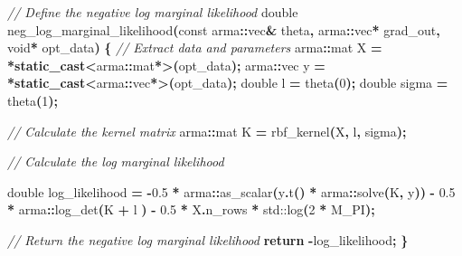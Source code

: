 \documentclass[
]{article}
\newenvironment{Shaded}{\begin{snugshade}}{\end{snugshade}}
\newcommand{\AttributeTok}[1]{\textcolor[rgb]{0.13,0.29,0.53}{#1}}
\newcommand{\BuiltInTok}[1]{#1}
\newcommand{\CommentTok}[1]{\textcolor[rgb]{0.56,0.35,0.01}{\textit{#1}}}
\newcommand{\ControlFlowTok}[1]{\textcolor[rgb]{0.13,0.29,0.53}{\textbf{#1}}}
\newcommand{\DataTypeTok}[1]{\textcolor[rgb]{0.13,0.29,0.53}{#1}}
\newcommand{\DecValTok}[1]{\textcolor[rgb]{0.00,0.00,0.81}{#1}}
\newcommand{\FloatTok}[1]{\textcolor[rgb]{0.00,0.00,0.81}{#1}}
\newcommand{\KeywordTok}[1]{\textcolor[rgb]{0.13,0.29,0.53}{\textbf{#1}}}
\newcommand{\NormalTok}[1]{#1}
\newcommand{\OperatorTok}[1]{\textcolor[rgb]{0.81,0.36,0.00}{\textbf{#1}}}
\begin{document}
\begin{Shaded}
\begin{Highlighting}[]
\CommentTok{// Define the negative log marginal likelihood}
\DataTypeTok{double}\NormalTok{ neg\_log\_marginal\_likelihood}\OperatorTok{(}\AttributeTok{const}\NormalTok{ arma}\OperatorTok{::}\NormalTok{vec}\OperatorTok{\&}\NormalTok{ theta}\OperatorTok{,}\NormalTok{ arma}\OperatorTok{::}\NormalTok{vec}\OperatorTok{*}\NormalTok{ grad\_out}\OperatorTok{,} \DataTypeTok{void}\OperatorTok{*}\NormalTok{ opt\_data}\OperatorTok{)} \OperatorTok{\{}
    \CommentTok{// Extract data and parameters}
\NormalTok{    arma}\OperatorTok{::}\NormalTok{mat X }\OperatorTok{=} \OperatorTok{*}\KeywordTok{static\_cast}\OperatorTok{\textless{}}\NormalTok{arma}\OperatorTok{::}\NormalTok{mat}\OperatorTok{*\textgreater{}(}\NormalTok{opt\_data}\OperatorTok{);}
\NormalTok{    arma}\OperatorTok{::}\NormalTok{vec y }\OperatorTok{=} \OperatorTok{*}\KeywordTok{static\_cast}\OperatorTok{\textless{}}\NormalTok{arma}\OperatorTok{::}\NormalTok{vec}\OperatorTok{*\textgreater{}(}\NormalTok{opt\_data}\OperatorTok{);}
    \DataTypeTok{double}\NormalTok{ l }\OperatorTok{=}\NormalTok{ theta}\OperatorTok{(}\DecValTok{0}\OperatorTok{);}
    \DataTypeTok{double}\NormalTok{ sigma }\OperatorTok{=}\NormalTok{ theta}\OperatorTok{(}\DecValTok{1}\OperatorTok{);}

    \CommentTok{// Calculate the kernel matrix}
\NormalTok{    arma}\OperatorTok{::}\NormalTok{mat K }\OperatorTok{=}\NormalTok{ rbf\_kernel}\OperatorTok{(}\NormalTok{X}\OperatorTok{,}\NormalTok{ l}\OperatorTok{,}\NormalTok{ sigma}\OperatorTok{);}

    \CommentTok{// Calculate the log marginal likelihood}
    
    \DataTypeTok{double}\NormalTok{ log\_likelihood }\OperatorTok{=} \OperatorTok{{-}}\FloatTok{0.5} \OperatorTok{*}\NormalTok{ arma}\OperatorTok{::}\NormalTok{as\_scalar}\OperatorTok{(}\NormalTok{y}\OperatorTok{.}\NormalTok{t}\OperatorTok{()} \OperatorTok{*}\NormalTok{ arma}\OperatorTok{::}\NormalTok{solve}\OperatorTok{(}\NormalTok{K}\OperatorTok{,}\NormalTok{ y}\OperatorTok{))} \OperatorTok{{-}} \FloatTok{0.5} \OperatorTok{*}\NormalTok{ arma}\OperatorTok{::}\NormalTok{log\_det}\OperatorTok{(}\NormalTok{K }\OperatorTok{+}\NormalTok{ l }\OperatorTok{)} \OperatorTok{{-}} \FloatTok{0.5} \OperatorTok{*}\NormalTok{ X}\OperatorTok{.}\NormalTok{n\_rows }\OperatorTok{*} \BuiltInTok{std::}\NormalTok{log}\OperatorTok{(}\DecValTok{2} \OperatorTok{*}\NormalTok{ M\_PI}\OperatorTok{);}

    \CommentTok{// Return the negative log marginal likelihood}
    \ControlFlowTok{return} \OperatorTok{{-}}\NormalTok{log\_likelihood}\OperatorTok{;}
\OperatorTok{\}}


\end{Highlighting}
\end{Shaded}
\end{document}

